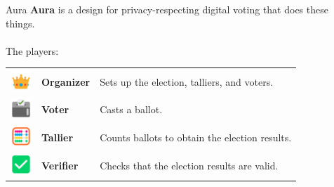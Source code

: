 \documentclass[aspectratio=169]{beamer}
\begin{document}
\begin{frame}{Aura}
    \textbf{Aura} is a design for privacy-respecting digital voting that does these things. \\~\\

    The players:
    \begin{table}
        \centering
        \begin{tabular}{>{\arraybackslash}m{40px} >{\arraybackslash}m{60px} >{\arraybackslash}m{220px}}
            \includegraphics[width=30px]{images/crown.png} & \textbf{Organizer} & Sets up the election, talliers, and voters. \\
            \includegraphics[width=30px]{images/ballot.png} & \textbf{Voter} & Casts a ballot. \\
            \includegraphics[width=30px]{images/abacus.png} & \textbf{Tallier} & Counts ballots to obtain the election results. \\
            \includegraphics[width=30px]{images/check.png} & \textbf{Verifier} & Checks that the election results are valid. \\
        \end{tabular}
    \end{table}
\end{frame}
\end{document}
